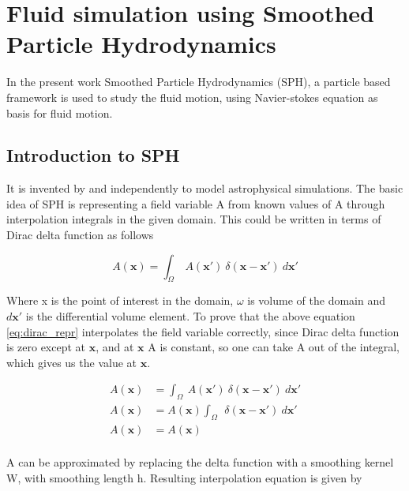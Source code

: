 \chapter{Fluid simulation using Smoothed Particle Hydrodynamics}
\label{cha:fluid-simul-using}


In the present work Smoothed Particle Hydrodynamics (SPH), a particle based
framework is used to study the fluid motion, using Navier-stokes
equation as basis for fluid motion.


\section{Introduction to SPH}


It is invented by \cite{lucy1977numerical} and
\cite{gingold-1977-smoot-partic-hydrod} independently to model astrophysical
simulations. The basic idea of SPH is representing a field variable
A from known values of A through interpolation integrals in the given
domain. This could be written in terms of Dirac delta function as follows

\begin{equation}
  \label{eq:dirac_repr}
  A(\boldsymbol{x}) = \int_{\Omega}\> A(\boldsymbol{x}') \> \delta(\boldsymbol{x} - \boldsymbol{x}') \> d\boldsymbol{x}'
\end{equation}

Where x is the point of interest in the domain, $\omega$ is volume of
the domain and $d\boldsymbol{x}'$ is the differential volume element.
To prove that the above equation \eqref{eq:dirac_repr} interpolates the
field variable correctly, since Dirac delta function is zero except at
$\boldsymbol{x}$, and at $\boldsymbol{x}$ A is constant, so one can take
A out of the integral, which gives us the value at $\boldsymbol{x}$.


\begin{align*}
  \label{eq:dirac_derivation}
  A(\boldsymbol{x}) &= \int_{\Omega}\> A(\boldsymbol{x}') \> \delta(\boldsymbol{x} - \boldsymbol{x}') \> d\boldsymbol{x}'\\
  A(\boldsymbol{x}) &= A(\boldsymbol{x}) \int_{\Omega}\> \> \delta(\boldsymbol{x} - \boldsymbol{x}') \> d\boldsymbol{x}'\\
  A(\boldsymbol{x}) &= A(\boldsymbol{x}) \\
\end{align*}

A can be approximated by replacing the delta function with a smoothing
kernel W, with smoothing length h. Resulting interpolation equation is given by

